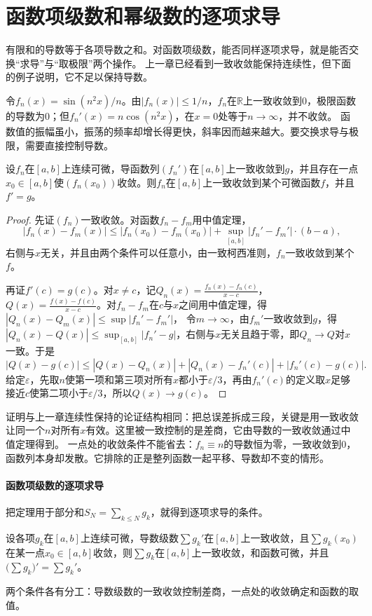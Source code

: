 \section{函数项级数和幂级数的逐项求导}
\label{sec:ru-termwise-differentiation}

有限和的导数等于各项导数之和。对函数项级数，能否同样逐项求导，就是能否交换“求导”与“取极限”两个操作。
上一章已经看到一致收敛能保持连续性，但下面的例子说明，它不足以保持导数。

令$f_n(x)=\sin(n^2x)/n$。由$|f_n(x)|\leq1/n$，$f_n$在$\mathbb R$上一致收敛到$0$，极限函数的导数为$0$；但$f_n'(x)=n\cos(n^2x)$，在$x=0$处等于$n\to\infty$，并不收敛。
函数值的振幅虽小，振荡的频率却增长得更快，斜率因而越来越大。要交换求导与极限，需要直接控制导数。
\begin{theorem}[函数列的求导与极限交换]
\label{thm:ru-uniform-derivative-limit}
设$f_n$在$[a,b]$上连续可微，导函数列$(f_n')$在$[a,b]$上一致收敛到$g$，并且存在一点$x_0\in[a,b]$使$(f_n(x_0))$收敛。则$f_n$在$[a,b]$上一致收敛到某个可微函数$f$，并且$f'=g$。
\end{theorem}
\begin{proof}
先证$(f_n)$一致收敛。对函数$f_n-f_m$用中值定理，
\[
 |f_n(x)-f_m(x)|\leq|f_n(x_0)-f_m(x_0)|+\sup_{[a,b]}|f_n'-f_m'|\cdot(b-a),
\]
右侧与$x$无关，并且由两个条件可以任意小，由一致柯西准则，$f_n$一致收敛到某个$f$。

再证$f'(c)=g(c)$。对$x\neq c$，记$Q_n(x)=\frac{f_n(x)-f_n(c)}{x-c}$，$Q(x)=\frac{f(x)-f(c)}{x-c}$。对$f_n-f_m$在$c$与$x$之间用中值定理，得$|Q_n(x)-Q_m(x)|\leq\sup|f_n'-f_m'|$，
令$m\to\infty$，由$f_m'$一致收敛到$g$，得$|Q_n(x)-Q(x)|\leq\sup_{[a,b]}|f_n'-g|$，右侧与$x$无关且趋于零，即$Q_n\to Q$对$x$一致。于是
\[
 |Q(x)-g(c)|\leq|Q(x)-Q_n(x)|+|Q_n(x)-f_n'(c)|+|f_n'(c)-g(c)|.
\]
给定$\varepsilon$，先取$n$使第一项和第三项对所有$x$都小于$\varepsilon/3$，再由$f_n'(c)$的定义取$x$足够接近$c$使第二项小于$\varepsilon/3$，所以$Q(x)\to g(c)$。
\end{proof}
证明与上一章连续性保持的论证结构相同：把总误差拆成三段，关键是用一致收敛让同一个$n$对所有$x$有效。这里被一致控制的是差商，它由导数的一致收敛通过中值定理得到。
一点处的收敛条件不能省去：$f_n\equiv n$的导数恒为零，一致收敛到$0$，函数列本身却发散。它排除的正是整列函数一起平移、导数却不变的情形。

\paragraph{函数项级数的逐项求导}
把定理用于部分和$S_N=\sum_{k\leq N}g_k$，就得到逐项求导的条件。
\begin{theorem}[逐项求导]
\label{thm:ru-termwise-derivative}
设各项$g_k$在$[a,b]$上连续可微，导数级数$\sum g_k'$在$[a,b]$上一致收敛，且$\sum g_k(x_0)$在某一点$x_0\in[a,b]$收敛，则$\sum g_k$在$[a,b]$上一致收敛，和函数可微，并且$\bigl(\sum g_k\bigr)'=\sum g_k'$。
\end{theorem}
两个条件各有分工：导数级数的一致收敛控制差商，一点处的收敛确定和函数的取值。

